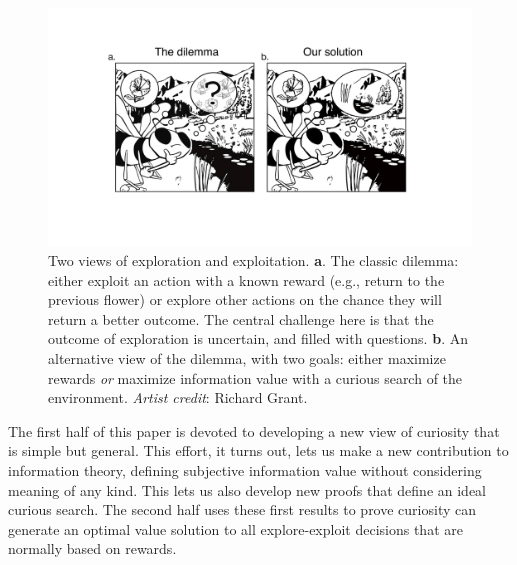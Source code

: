 \begin{figure}
	\begin{fullwidth}
	\includegraphics[width=.55\linewidth]{dilemma-draft-elife/img/bee.pdf} 
	\caption{Two views of exploration and exploitation. \textbf{a}. The classic dilemma: either exploit an action with a known reward (e.g., return to the previous flower) or explore other actions on the chance they will return a better outcome. The central challenge here is that the outcome of exploration is uncertain, and filled with questions. \textbf{b}. An alternative view of the dilemma, with two goals: either maximize rewards \textit{or} maximize information value with a curious search of the environment. \textit{Artist credit}: Richard Grant.}
	\label{fig:bee} 
	\end{fullwidth}
\end{figure}

The first half of this paper is devoted to developing a new view of curiosity that is simple but general. This effort, it turns out, lets us make a new contribution to information theory, defining subjective information value without considering meaning of any kind. This lets us also develop new proofs that define an ideal curious search. The second half uses these first results to prove curiosity can generate an optimal value solution to all explore-exploit decisions that are normally based on rewards.

